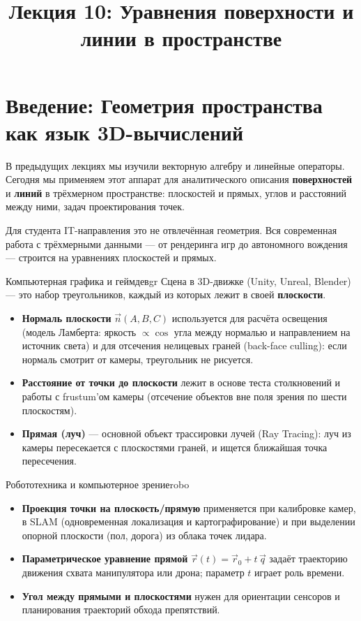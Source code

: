 \documentclass[12pt,a4paper]{article}
\title{Лекция 10: Уравнения поверхности и линии в пространстве}
\author{}
\date{}
\begin{document}
\maketitle
\thispagestyle{fancy}

\section*{Введение: Геометрия пространства как язык 3D-вычислений}

В предыдущих лекциях мы изучили векторную алгебру и линейные операторы.
Сегодня мы применяем этот аппарат для аналитического описания
\textbf{поверхностей} и \textbf{линий} в трёхмерном пространстве:
плоскостей и прямых, углов и расстояний между ними, задач проектирования
точек.

Для студента IT-направления это не отвлечённая геометрия. Вся современная
работа с трёхмерными данными --- от рендеринга игр до автономного
вождения --- строится на уравнениях плоскостей и прямых.

\begin{remarkIT}{Компьютерная графика и геймдев}{gr}
  Сцена в 3D-движке (Unity, Unreal, Blender) --- это набор треугольников,
  каждый из которых лежит в своей \textbf{плоскости}.
  \begin{itemize}
    \item \textbf{Нормаль плоскости} $\vec{n}(A,B,C)$ используется для
      расчёта освещения (модель Ламберта: яркость $\propto
      \cos$ угла между нормалью и направлением на источник света) и
      для отсечения нелицевых граней (back-face culling): если нормаль
      смотрит от камеры, треугольник не рисуется.
    \item \textbf{Расстояние от точки до плоскости} лежит в основе
      теста столкновений и работы с frustum'ом камеры (отсечение
      объектов вне поля зрения по шести плоскостям).
    \item \textbf{Прямая (луч)} --- основной объект трассировки лучей
      (Ray Tracing): луч из камеры пересекается с плоскостями граней,
      и ищется ближайшая точка пересечения.
  \end{itemize}
\end{remarkIT}

\begin{remarkIT}{Робототехника и компьютерное зрение}{robo}
  \begin{itemize}
    \item \textbf{Проекция точки на плоскость/прямую} применяется при
      калибровке камер, в SLAM (одновременная локализация и
      картографирование) и при выделении опорной плоскости (пол,
      дорога) из облака точек лидара.
    \item \textbf{Параметрическое уравнение прямой} $\vec{r}(t) =
      \vec{r}_0 + t\,\vec{q}$ задаёт траекторию движения схвата
      манипулятора или дрона; параметр $t$ играет роль времени.
    \item \textbf{Угол между прямыми и плоскостями} нужен для
      ориентации сенсоров и планирования траекторий обхода
      препятствий.
  \end{itemize}
\end{remarkIT}
\end{document}
